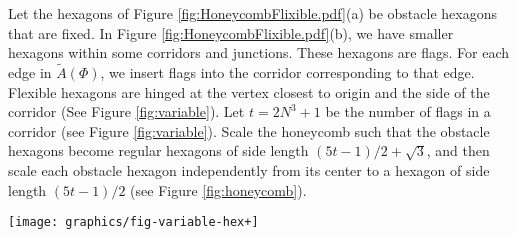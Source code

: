 Let the hexagons of Figure \ref{fig:HoneycombFlixible.pdf}(a) be obstacle hexagons that are fixed.
In Figure \ref{fig:HoneycombFlixible.pdf}(b), we have smaller hexagons within some corridors and junctions.
These hexagons are flags.
For each edge in $\tilde{A}(\Phi)$, we insert flags into the corridor corresponding to that edge.
Flexible hexagons are hinged at the vertex closest to origin and the side of the corridor (See Figure \ref{fig:variable}).
Let $t=2N^3+1$ be the number of flags in a corridor (see Figure \ref{fig:variable}). 
Scale the honeycomb such that the obstacle hexagons become regular hexagons of side length $(5t-1)/2+\sqrt{3}$, and then scale each obstacle hexagon independently from its center to a hexagon of side length $(5t-1)/2$ (see Figure \ref{fig:honeycomb}). 

\begin{minipage}{\linewidth}
\begin{center}
\texttt{[image: graphics/fig-variable-hex+]}
\label{fig:variable}
\end{center}
\end{minipage}

